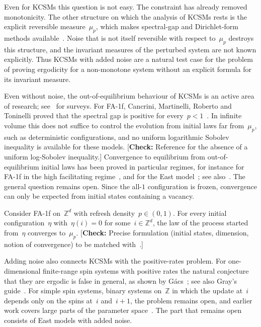 \documentclass[EJP,preprint,NODS,nobera]{ejpecp}
\newcommand{\Z}{\mathbb{Z}}
\newcommand{\authorcheck}[1]{{\color{blue}[\textbf{Check:} #1]}}
\begin{document}
Even for KCSMs this question is not easy. The constraint has already removed
monotonicity. The other structure on which the analysis of KCSMs rests is the
explicit reversible measure~$\mu_p$, which makes spectral-gap and
Dirichlet-form methods available~\cite{CancriniEtAl2008}. Noise that is not
itself reversible with respect to~$\mu_p$ destroys this structure, and the
invariant measures of the perturbed system are not known explicitly. Thus
KCSMs with added noise are a natural test case for the problem of proving
ergodicity for a non-monotone system without an explicit formula for its
invariant measure.

Even without noise, the out-of-equilibrium behaviour of KCSMs is an active
area of research; see~\cite{HartarskyToninelli2024,MartinelliShapiraToninelli2025}
for surveys. For FA-1f, Cancrini, Martinelli, Roberto and Toninelli proved
that the spectral gap is positive for every~$p<1$~\cite{CancriniEtAl2008}.
In infinite volume this does not suffice to control the evolution from
initial laws far from~$\mu_p$, such as deterministic configurations, and no
uniform logarithmic Sobolev inequality is available for these models.
\authorcheck{Reference for the absence of a uniform log-Sobolev inequality.}
Convergence to equilibrium from out-of-equilibrium initial laws has been
proved in particular regimes, for instance for FA-1f in the high facilitating
regime~\cite{BlondelEtAl2013}, and for the East
model~\cite{CancriniEtAl2010,Mareche2019}; see
also~\cite{MountfordValle2019,HartarskyToninelli2024,MartinelliShapiraToninelli2025}.
The general question remains open. Since the all-$1$ configuration is frozen,
convergence can only be expected from initial states containing a vacancy.

\begin{conjecture}
\label{conj:fa1f}
Consider FA-1f on~$\Z^d$ with refresh density~$p\in(0,1)$. For every initial
configuration~$\eta$ with~$\eta(i)=0$ for some~$i\in\Z^d$, the law of the
process started from~$\eta$ converges to~$\mu_p$.
\authorcheck{Precise formulation (initial states, dimension, notion of
convergence) to be matched with~\cite{MartinelliShapiraToninelli2025}.}
\end{conjecture}

Adding noise also connects KCSMs with the positive-rates problem. For
one-dimensional finite-range spin systems with positive rates the natural
conjecture that they are ergodic is false in general, as shown by
G\'acs~\cite{Gacs1986,Gacs2001}; see also Gray's guide~\cite{Gray2001}.
For simple spin systems, binary systems on~$\Z$ in which the update at~$i$
depends only on the spins at~$i$ and~$i+1$, the problem remains open, and
earlier work covers large parts of the parameter
space~\cite{GluchowskiMenz2025,GluchowskiMenz2026}. The part that remains
open consists of East models with added noise.
\end{document}
